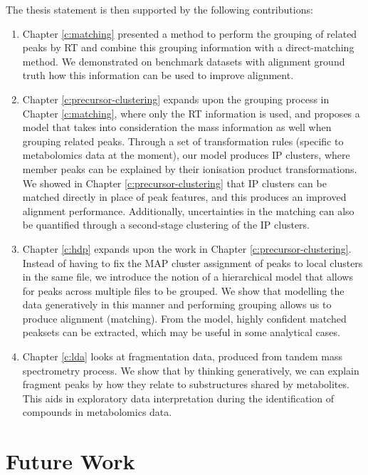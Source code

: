 The thesis statement is then supported by the following contributions:

\begin{enumerate}

\item Chapter \ref{c:matching} presented a method to perform the grouping of related peaks by RT and combine this grouping information with a direct-matching method. We demonstrated on benchmark datasets with alignment ground truth how this information can be used to improve alignment. 

\item Chapter \ref{c:precursor-clustering} expands upon the grouping process in Chapter \ref{c:matching}, where only the RT information is used, and proposes a model that takes into consideration the mass information as well when grouping related peaks. Through a set of transformation rules (specific to metabolomics data at the moment), our model produces IP clusters, where member peaks can be explained by their ionisation product transformations. We showed in Chapter \ref{c:precursor-clustering} that IP clusters can be matched directly in place of peak features, and this produces an improved alignment performance. Additionally, uncertainties in the matching can also be quantified through a second-stage clustering of the IP clusters.

\item Chapter \ref{c:hdp} expands upon the work in Chapter \ref{c:precursor-clustering}. Instead of having to fix the MAP cluster assignment of peaks to local clusters in the same file, we introduce the notion of a hierarchical model that allows for peaks across multiple files to be grouped. We show that modelling the data generatively in this manner and performing grouping allows us to produce alignment (matching). From the model, highly confident matched peaksets can be extracted, which may be useful in some analytical cases.

\item Chapter \ref{c:lda} looks at fragmentation data, produced from tandem mass spectrometry process. We show that by thinking generatively, we can explain fragment peaks by how they relate to substructures shared by metabolites. This aids in exploratory data interpretation during the identification of compounds in metabolomics data. 

\end{enumerate}

\section{Future Work}

